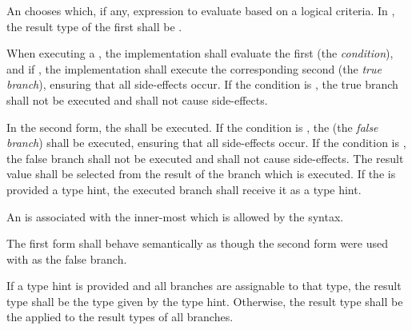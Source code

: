 \begin{grammar}
 \\
	  \\
	    \\

 \\
	\terminal{(}  \terminal{)}  \\
\end{grammar}

\specsubsubitem
An  chooses which, if any, expression to evaluate
based on a logical criteria. In , the result type of
the first  shall be .

\specsubsubitem
When executing a , the implementation shall
evaluate the first  (the \textit{condition}), and if
, the implementation shall execute the corresponding second
 (the \textit{true branch}), ensuring that all
side-effects occur. If the condition is , the true branch shall
not be executed and shall not cause side-effects.

\specsubsubitem
In the second form, the  shall be executed. If
the condition is , the  (the
\textit{false branch}) shall be executed, ensuring that all side-effects occur.
If the condition is , the false branch shall not be executed and
shall not cause side-effects. The result value shall be selected from the result
of the branch which is executed. If the  is provided
a type hint, the executed branch shall receive it as a type hint.

\specsubsubitem
An  is associated with the inner-most 
which is allowed by the syntax.

\specsubsubitem
The first form shall behave semantically as though the second form were used
with  as the false branch.

\specsubsubitem
If a type hint is provided and all branches are assignable to that type, the
result type shall be the type given by the type hint. Otherwise, the result type
shall be the  applied to the result
types of all branches.

